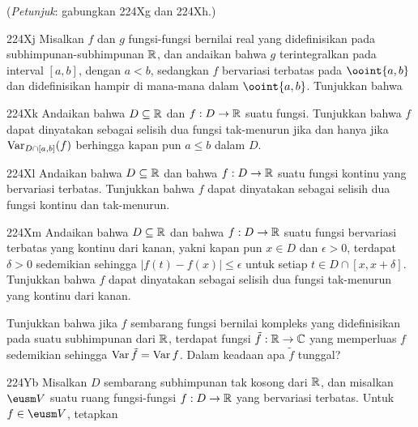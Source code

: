 {

\noindent({\it Petunjuk\/}: gabungkan 224Xg dan 224Xh.)

\spheader 224Xj Misalkan $f$ dan $g$ fungsi-fungsi bernilai real yang
didefinisikan pada subhimpunan-subhimpunan $\Bbb R$, dan andaikan bahwa
$g$ terintegralkan pada interval $[a,b]$, dengan $a<b$, sedangkan $f$
bervariasi terbatas pada $\ooint{a,b}$ dan didefinisikan hampir di
mana-mana dalam $\ooint{a,b}$. Tunjukkan bahwa


\spheader 224Xk Andaikan bahwa $D\subseteq\Bbb R$ dan
$f:D\to\Bbb R$ suatu fungsi. Tunjukkan bahwa $f$ dapat dinyatakan sebagai
selisih dua fungsi tak-menurun jika dan hanya jika
$\mathop{\text{Var}}_{D\cap[a,b]}(f)$ berhingga kapan pun $a\le b$ dalam $D$.

\spheader 224Xl
Andaikan bahwa $D\subseteq\Bbb R$ dan bahwa $f:D\to\Bbb R$ suatu fungsi
kontinu yang bervariasi terbatas. Tunjukkan bahwa $f$ dapat dinyatakan
sebagai selisih dua fungsi kontinu dan tak-menurun.

\spheader 224Xm
Andaikan bahwa $D\subseteq\Bbb R$ dan bahwa $f:D\to\Bbb R$ suatu fungsi
bervariasi terbatas yang kontinu dari kanan, yakni kapan pun $x\in D$ dan
$\epsilon>0$, terdapat $\delta>0$ sedemikian sehingga
$|f(t)-f(x)|\le\epsilon$ untuk setiap $t\in D\cap[x,x+\delta]$.
Tunjukkan bahwa $f$ dapat dinyatakan sebagai selisih dua fungsi
tak-menurun yang kontinu dari kanan.

Tunjukkan bahwa jika $f$ sembarang fungsi bernilai kompleks yang
didefinisikan pada suatu subhimpunan dari $\Bbb R$, terdapat fungsi
$\tilde f:\Bbb R\to\Bbb C$ yang memperluas $f$ sedemikian sehingga
$\mathop{\text{Var}}\tilde f=\mathop{\text{Var}} f$. Dalam keadaan apa $\tilde f$ tunggal?

\spheader 224Yb Misalkan $D$ sembarang subhimpunan tak kosong dari
$\Bbb R$, dan misalkan $\eusm V$ suatu ruang fungsi-fungsi
$f:D\to\Bbb R$ yang bervariasi terbatas. Untuk $f\in\eusm V$, tetapkan


}
